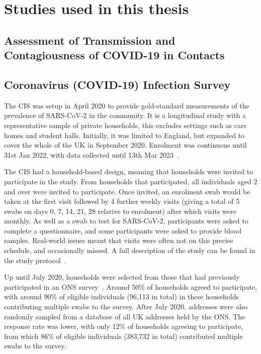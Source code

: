 \documentclass[thesis.tex]{subfiles}
\begin{document}

\section{Studies used in this thesis} \label{biology-data:sec:studies}

\subsection{Assessment of Transmission and Contagiousness of COVID-19 in Contacts}

\subsection{Coronavirus (COVID-19) Infection Survey} \label{intro:sec:cis}

The CIS was setup in April 2020 to provide gold-standard measurements of the prevalence of SARS-CoV-2 in the community.
It is a longitudinal study with a representative sample of private households, this excludes settings such as care homes and student halls.
Initially, it was limited to England, but expanded to cover the whole of the UK in September 2020.
Enrolment was continuous until 31st Jan 2022, with data collected until 13th Mar 2023~\autocite{weiRisk}. 

The CIS had a household-based design, meaning that households were invited to participate in the study.
From households that participated, all individuals aged 2 and over were invited to participate.
Once invited, an enrolment swab would be taken at the first visit followed by 4 further weekly visits (giving a total of 5 swabs on days 0, 7, 14, 21, 28 relative to enrolment) after which visits were monthly.
As well as a swab to test for SARS-CoV-2, participants were asked to complete a questionnaire, and some participants were asked to provide blood samples.
Real-world issues meant that visits were often not on this precise schedule, and occasionally missed.
A full description of the study can be found in the study protocol~\autocite{cisProtocol}.

Up until July 2020, households were selected from those that had previously participated in an ONS survey~\autocite{CIStechData}.
Around 50\% of households agreed to participate, with around 90\% of eligible individuals (96,113 in total) in these households contributing multiple swabs to the survey.
After July 2020, addresses were also randomly sampled from a database of all UK addresses held by the ONS.
The response rate was lower, with only 12\% of households agreeing to participate, from which 86\% of eligible individuals (383,732 in total) contributed multiple swabs to the survey.
\end{document}
